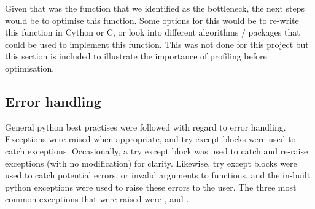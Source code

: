     Given that  was the function that we identified as the
    bottleneck, the next steps would be to optimise this function.
    Some options for this would be to re-write this function in Cython or C, or look into different algorithms / packages
    that could be used to implement this function.
    This was not done for this project but this section is included to illustrate the importance of profiling before
    optimisation.

    \subsection{Error handling}\label{subsec:coding-best-practises}
    General python best practises were followed with regard to error handling.
    Exceptions were raised when appropriate, and try except blocks were used to catch exceptions.
    Occasionally, a try except block was used to catch and re-raise exceptions (with no modification) for clarity.
    Likewise, try except blocks were used to catch potential errors, or invalid arguments to functions, and the in-built
    python exceptions were used to raise these errors to the user.
    The three most common exceptions that were raised were ,  and
    .
